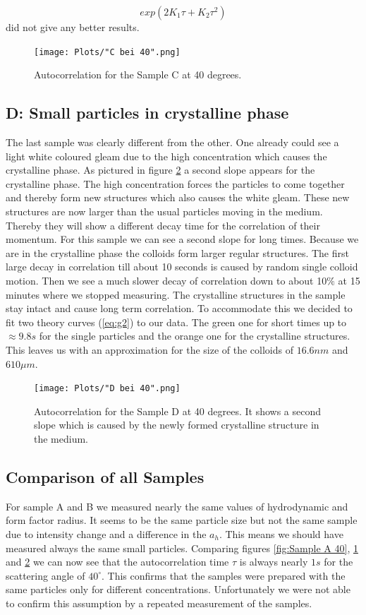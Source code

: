 \documentclass[]{article}
\begin{document}
\begin{equation}
	exp(2 K_1\tau +K_2 \tau^2)	
\end{equation}
did not give any better results.

\begin{figure}[!htbp]
\centering
\texttt{[image: Plots/"C bei 40".png]}
\caption{Autocorrelation for the Sample C at 40 degrees.}
\label{C}
\end{figure}

\subsection{D: Small particles in crystalline phase}
The last sample was clearly different from the other. One already could see a light white coloured gleam due to the high concentration which causes the crystalline phase. As pictured in figure \ref{D} a second slope appears for the crystalline phase. The high concentration forces the particles to come together and thereby form new structures which also causes the white gleam. These new structures are now larger than the usual particles moving in the medium. Thereby they will show a different decay time for the correlation of their momentum.
For this sample we can see a second slope for long times. Because we are in the crystalline phase the colloids form larger regular structures. The first large decay in correlation till about 10 seconds is caused by random single colloid motion. Then we see a much slower decay of correlation down to about 10$\%$ at 15 minutes where we stopped measuring. The crystalline structures in the sample stay intact and cause long term correlation. 
To accommodate this we decided to fit two theory curves (\ref{eq:g2}) to our data. The green one for short times up to $\approx 9.8s$ for the single particles and the orange one for the crystalline structures. This leaves us with an approximation for the size of the colloids of $16.6nm$ and $610\mu m$.


\begin{figure}[!htbp]
\centering
\texttt{[image: Plots/"D bei 40".png]}
\caption{Autocorrelation for the Sample D at 40 degrees. It shows a second slope which is caused by the newly formed crystalline structure in the medium.}
\label{D}
\end{figure}



\subsection{Comparison of all Samples}
For sample A and B we measured nearly the same values of hydrodynamic and form factor radius. It seems to be the same particle size but not the same sample due to intensity change and a difference in the $a_h$. This means we should have measured always the same small particles. Comparing figures \ref{fig:Sample A 40}, \ref{C} and \ref{D} we can now see that the autocorrelation time $\tau$ is always nearly $1s$ for the scattering angle of $40^\circ$. This confirms that the samples were prepared with the same particles only for different concentrations. Unfortunately we were not able to confirm this assumption by a repeated measurement of the samples.
 
\end{document}
